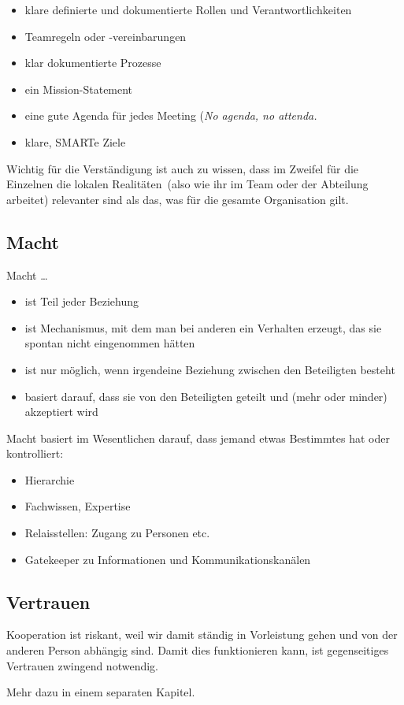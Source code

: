 \begin{itemize}
  \item klare definierte und dokumentierte Rollen und Verantwortlichkeiten 
  \item Teamregeln oder -vereinbarungen 
  \item klar dokumentierte Prozesse 
  \item ein Mission-Statement 
  \item eine gute Agenda für jedes Meeting (\glqq\emph{No agenda, no attenda.\grqq} 
  \item klare, SMARTe Ziele
\end{itemize}

Wichtig für die Verständigung ist auch zu wissen, dass im Zweifel für die Einzelnen die \glqq lokalen Realitäten\grqq\ (also wie ihr im Team oder der Abteilung arbeitet) relevanter sind als das, was für die gesamte Organisation gilt.


\subsection{Macht}

Macht …

\begin{itemize}
  \item ist Teil jeder Beziehung
  \item ist Mechanismus, mit dem man bei anderen ein Verhalten erzeugt, das sie spontan nicht eingenommen hätten
  \item ist nur möglich, wenn irgendeine Beziehung zwischen den Beteiligten besteht
  \item basiert darauf, dass sie von den Beteiligten geteilt und (mehr oder minder) akzeptiert wird
\end{itemize}

Macht basiert im Wesentlichen darauf, dass jemand etwas Bestimmtes hat oder kontrolliert:

\begin{itemize}
  \item Hierarchie
  \item Fachwissen, Expertise
  \item Relaisstellen: Zugang zu Personen etc.
  \item Gatekeeper zu Informationen und Kommunikationskanälen
\end{itemize}


\subsection{Vertrauen}

Kooperation ist riskant, weil wir damit ständig in Vorleistung gehen und von der anderen Person abhängig sind. Damit dies funktionieren kann, ist gegenseitiges Vertrauen zwingend notwendig.

Mehr dazu in einem separaten Kapitel.
